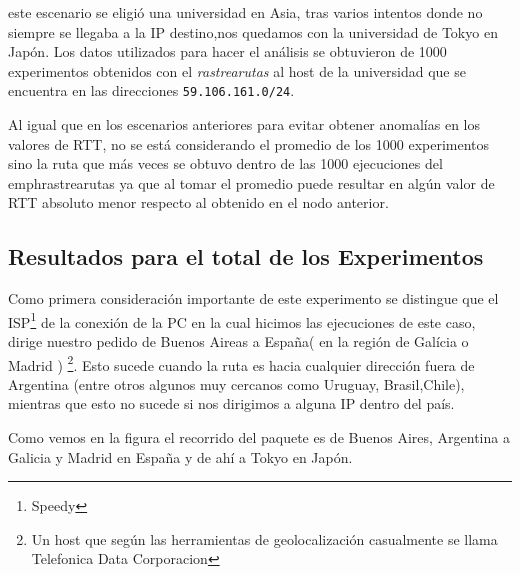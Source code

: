  este escenario se eligi\'o una universidad en Asia, tras varios intentos donde no siempre se llegaba a la IP destino,nos quedamos con la universidad de Tokyo en Jap\'on.
Los datos utilizados para hacer el an\'alisis se obtuvieron de 1000 experimentos obtenidos con el \emph{rastrearutas} al host de la universidad que se encuentra en las direcciones \texttt{59.106.161.0/24}. \newline

\par Al igual que en los escenarios anteriores para evitar obtener anomal\'ias en los valores de RTT, no se est\'a considerando el promedio de los 1000 experimentos sino la ruta que m\'as veces se obtuvo dentro de las 1000 ejecuciones del emph{rastrearutas} ya que al tomar el promedio puede resultar en alg\'un valor de RTT absoluto menor respecto al obtenido en el nodo anterior. \newline


\subsection{Resultados para el total de los Experimentos}

\par Como primera consideraci\'on importante de este experimento se distingue que el ISP\footnote{Speedy} de la conexi\'on de la PC en la cual hicimos las ejecuciones de este caso, dirige nuestro pedido de Buenos Aireas a España( en la región de Gal\'icia o Madrid ) \footnote{Un host que seg\'un las herramientas de geolocalizaci\'on casualmente se llama Telefonica Data Corporacion}. Esto sucede cuando la ruta es hacia cualquier direcci\'on fuera de Argentina (entre otros algunos muy cercanos como Uruguay, Brasil,Chile), mientras que esto no sucede si nos dirigimos a alguna IP dentro del pa\'is. \newline



\par Como vemos en la figura %
el recorrido del paquete es de Buenos Aires, Argentina a Galicia y Madrid en España y de ah\'i a Tokyo en Jap\'on. \newline

